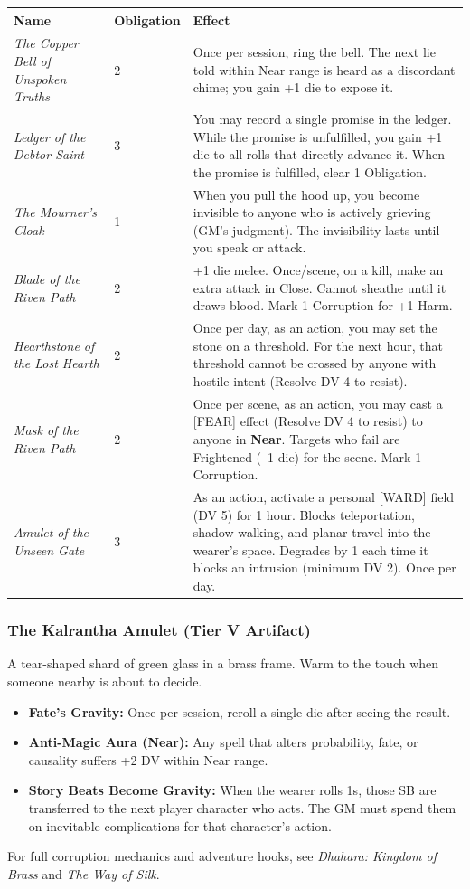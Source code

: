\begin{longtable}{p{4cm}p{3cm}p{9cm}}
\toprule
\textbf{Name} & \textbf{Obligation} & \textbf{Effect} \\
\midrule
\textit{The Copper Bell of Unspoken Truths} & 2 & Once per session, ring the bell. The next lie told within Near range is heard as a discordant chime; you gain +1 die to expose it. \\
\textit{Ledger of the Debtor Saint} & 3 & You may record a single promise in the ledger. While the promise is unfulfilled, you gain +1 die to all rolls that directly advance it. When the promise is fulfilled, clear 1 Obligation. \\
\textit{The Mourner's Cloak} & 1 & When you pull the hood up, you become invisible to anyone who is actively grieving (GM's judgment). The invisibility lasts until you speak or attack. \\
\textit{Blade of the Riven Path} & 2 & +1 die melee. Once/scene, on a kill, make an extra attack in Close. Cannot sheathe until it draws blood. Mark 1 Corruption for +1 Harm. \\
\textit{Hearthstone of the Lost Hearth} & 2 & Once per day, as an action, you may set the stone on a threshold. For the next hour, that threshold cannot be crossed by anyone with hostile intent (Resolve DV 4 to resist). \\
\textit{Mask of the Riven Path} & 2 & Once per scene, as an action, you may cast a [FEAR] effect (Resolve DV 4 to resist) to anyone in \textbf{Near}. Targets who fail are Frightened (--1 die) for the scene. Mark 1 Corruption. \\
\textit{Amulet of the Unseen Gate} & 3 & As an action, activate a personal [WARD] field (DV 5) for 1 hour. Blocks teleportation, shadow-walking, and planar travel into the wearer's space. Degrades by 1 each time it blocks an intrusion (minimum DV 2). Once per day. \\
\bottomrule
\end{longtable}

\subsubsection{The Kalrantha Amulet (Tier V Artifact)}
A tear-shaped shard of green glass in a brass frame. Warm to the touch when someone nearby is about to decide.
\begin{itemize}
    \item \textbf{Fate's Gravity:} Once per session, reroll a single die after seeing the result.
    \item \textbf{Anti-Magic Aura (Near):} Any spell that alters probability, fate, or causality suffers +2 DV within Near range.
    \item \textbf{Story Beats Become Gravity:} When the wearer rolls 1s, those SB are transferred to the next player character who acts. The GM must spend them on inevitable complications for that character's action.
\end{itemize}
For full corruption mechanics and adventure hooks, see \textit{Dhahara: Kingdom of Brass} and \textit{The Way of Silk}.

